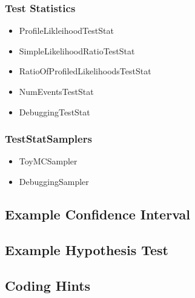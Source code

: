 \documentclass[11pt]{article}
\begin{document}
\subsubsection{Test Statistics}
\begin{itemize}
 \item ProfileLikleihoodTestStat
 \item SimpleLikelihoodRatioTestStat
 \item RatioOfProfiledLikelihoodsTestStat
 \item NumEventsTestStat
 \item DebuggingTestStat
\end{itemize}

\subsubsection{TestStatSamplers}
\begin{itemize}
 \item ToyMCSampler
 \item DebuggingSampler
\end{itemize}

\subsection{Example Confidence Interval}




\subsection{Example Hypothesis Test}

\subsection{Coding Hints}
\end{document}
